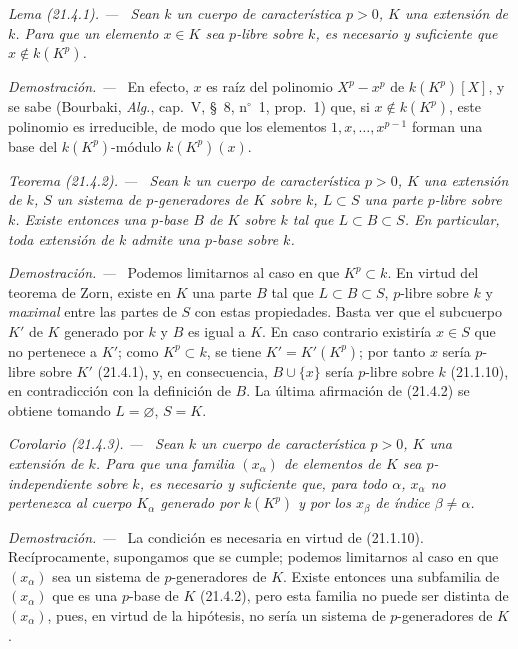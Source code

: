 \documentclass[10pt,oneside]{book}
\makeatletter
\newcommand{\setmanualcurrentlabel}[1]{\def\@currentlabel{#1}}
\newenvironment{theorem}[1][]{%
  \setmanualcurrentlabel{#1}\par\medskip\noindent\itshape Teorema (#1). ---\ }{\par}
\newenvironment{corollary}[1][]{%
  \setmanualcurrentlabel{#1}\par\medskip\noindent\itshape Corolario (#1). ---\ }{\par}
\newenvironment{lemma}[1][]{%
  \setmanualcurrentlabel{#1}\par\medskip\noindent\itshape Lema (#1). ---\ }{\par}
\newenvironment{proof}{%
  \par\medskip\noindent\textit{Demostración. ---\ }}{\par}
\providecommand{\setmin}{-}%
\makeatother
\begin{document}
\begin{lemma}[21.4.1]
\label{0.21.4.1-es}
Sean $k$ un cuerpo de característica $p>0$, $K$ una extensión de $k$. Para
que un elemento $x\in K$ sea $p$-libre sobre $k$, es necesario y suficiente
que $x\notin k(K^p)$.
\end{lemma}

\begin{proof}
En efecto, $x$ es raíz del polinomio $X^p\setmin x^p$ de $k(K^p)[X]$, y se sabe
(Bourbaki, \emph{Alg.}, cap.~V, §~8, n$^\circ$~1, prop.~1) que, si
$x\notin k(K^p)$, este polinomio es irreducible, de modo que los elementos
$1,x,\ldots,x^{p-1}$ forman una base del $k(K^p)$-módulo $k(K^p)(x)$.
\end{proof}

\begin{theorem}[21.4.2]
\label{0.21.4.2-es}
Sean $k$ un cuerpo de característica $p>0$, $K$ una extensión de $k$,
$S$ un sistema de $p$-generadores de $K$ sobre $k$, $L\subset S$ una parte
$p$-libre sobre $k$. Existe entonces una $p$-base $B$ de $K$ sobre $k$ tal que
$L\subset B\subset S$. En particular, toda extensión de $k$ admite una
$p$-base sobre $k$.
\end{theorem}

\begin{proof}
Podemos limitarnos al caso en que $K^p\subset k$. En virtud del teorema de
Zorn, existe en $K$ una parte $B$ tal que $L\subset B\subset S$, $p$-libre
sobre $k$ y \emph{maximal} entre las partes de $S$ con estas propiedades. Basta ver
que el subcuerpo $K'$ de $K$ generado por $k$ y $B$ es igual a $K$.
En caso contrario existiría $x\in S$ que no pertenece a $K'$; como
$K^p\subset k$, se tiene $K'=K'(K^p)$; por tanto $x$ sería $p$-libre sobre
$K'$ (21.4.1), y, en consecuencia, $B\cup\{x\}$ sería $p$-libre sobre $k$
(21.1.10), en contradicción con la definición de $B$. La última afirmación de
(21.4.2) se obtiene tomando $L=\varnothing$, $S=K$.
\end{proof}

\begin{corollary}[21.4.3]
\label{0.21.4.3-es}
Sean $k$ un cuerpo de característica $p>0$, $K$ una extensión de $k$.
Para que una familia $(x_\alpha)$ de elementos de $K$ sea $p$-independiente sobre $k$,
es necesario y suficiente que, para todo $\alpha$, $x_\alpha$ no pertenezca al
cuerpo $K_\alpha$ generado por $k(K^p)$ y por los $x_\beta$ de índice
$\beta\neq\alpha$.
\end{corollary}

\begin{proof}
La condición es necesaria en virtud de (21.1.10). Recíprocamente, supongamos que se
cumple; podemos limitarnos al caso en que $(x_\alpha)$ sea un sistema de
$p$-generadores de $K$. Existe entonces una subfamilia de $(x_\alpha)$ que es una
$p$-base de $K$ (21.4.2), pero esta familia no puede ser distinta de $(x_\alpha)$,
pues, en virtud de la hipótesis, no sería un sistema de $p$-generadores de $K$.
\end{proof}
\end{document}
